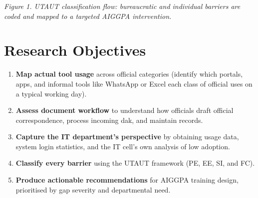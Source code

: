 \documentclass[11pt,a4paper]{article}
\begin{document}
\vspace{0.5cm}

\begin{center}
\end{center}

\vspace{0.2cm}
\begin{center}
\small\textit{Figure 1. UTAUT classification flow: bureaucratic and individual 
barriers are coded and mapped to a targeted AIGGPA intervention.}
\end{center}

\section{Research Objectives}

\vspace{0.2cm}
\begin{navybox}
\begin{enumerate}[label={\color{gold}\bfseries\arabic*.},itemsep=5pt]
  \item \textbf{Map actual tool usage} across official categories (identify which
    portals, apps, and informal tools like WhatsApp or Excel each
    class of official uses on a typical working day).
  \item \textbf{Assess document workflow} to understand how officials draft official
    correspondence, process incoming dak, and maintain records.
  \item \textbf{Capture the IT department's perspective} by obtaining usage data,
    system login statistics, and the IT cell's own analysis of low adoption.
  \item \textbf{Classify every barrier} using the UTAUT framework (PE, 
    EE, SI, and FC).
  \item \textbf{Produce actionable recommendations} for AIGGPA training design,
    prioritised by gap severity and departmental need.
\end{enumerate}
\end{navybox}
\end{document}
